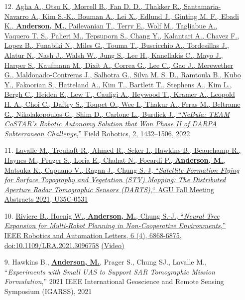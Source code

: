 \documentclass[12pt,letter,sans]{moderncv}        %
\begin{document}
\begin{itemize}
    \item [12.] \href{https://arxiv.org/abs/2103.11470}
    {Agha A., Otsu K., Morrell B., Fan D. D., Thakker R., Santamaria-Navarro A., Kim S.-K., Bouman A., Lei X., Edlund J., Ginting M. F., Ebadi K., \underline{\textbf{Anderson, M.}}, Pailevanian T., Terry E., Wolf M., Tagliabue A., Vaquero T. S., Palieri M., Tepsuporn S., Chang Y., Kalantari A., Chavez F., Lopez B., Funabiki N., Miles G., Touma T., Buscicchio A., Tordesillas J., Alatur N., Nash J., Walsh W., Jung S., Lee H., Kanellakis C., Mayo J., Harper S., Kaufmann M., Dixit A., Correa G., Lee C., Gao J., Merewether G., Maldonado-Contreras J., Salhotra G., Silva M. S. D., Ramtoula B., Kubo Y., Fakoorian S., Hatteland A., Kim T., Bartlett T., Stephens A., Kim L., Bergh C., Heiden E., Lew T., Cauligi A., Heywood T., Kramer A., Leopold H. A., Choi C., Daftry S., Toupet O., Wee I., Thakur A., Feras M., Beltrame G., Nikolakopoulos G., Shim D., Carlone L., Burdick J., ``\textit{NeBula: TEAM CoSTAR’s Robotic Autonomy Solution that Won Phase II of DARPA Subterranean Challenge},'' Field Robotics, 2, 1432–1506, 2022}

    \item [11.] \href{https://www.researchgate.net/publication/355255608_Distributed_Aperture_Radar_Tomographic_Sensors_DARTS_to_Map_Surface_Topography_and_Vegetation_Structure}
    {Lavalle M., Treuhaft R., Ahmed R., Seker I., Hawkins B., Beauchamp R., Haynes M., Prager S., Loria E., Chahat N., Focardi P., \underline{\textbf{Anderson, M.}}, Matsuka K., Capuano V., Ragan J., Chung S.-J, ``\textit{Satellite Formation Flying for Surface Topography and Vegetation (STV) Mapping: The Distributed Aperture Radar Tomographic Sensors (DARTS)},`` AGU Fall Meeting Abstracts 2021, U35C-0531}
    
    \item [10.] \href{https://arxiv.org/pdf/2104.09705}
    {Riviere B., Hoenig W., \underline{\textbf{Anderson, M.}}, Chung S.-J., ``\textit{Neural Tree Expansion for Multi-Robot Planning in Non-Cooperative Environments},''  IEEE Robotics and Automation Letters, 6 (4), 6868-6875, doi:10.1109/LRA.2021.3096758}
    \href{https://youtu.be/tkmTYUWnAOw?si=qUoDkA8bU4YgKJ3H}{(Video)}
    
    \item [9.] Hawkins B., \underline{\textbf{Anderson, M.}}, Prager S., Chung SJ., Lavalle M., ``\textit{Experiments with Small UAS to Support SAR Tomographic Mission Formulation},'' 2021 IEEE International Geoscience and Remote Sensing Symposium (IGARSS), 2021
    

\end{itemize}
\end{document}
